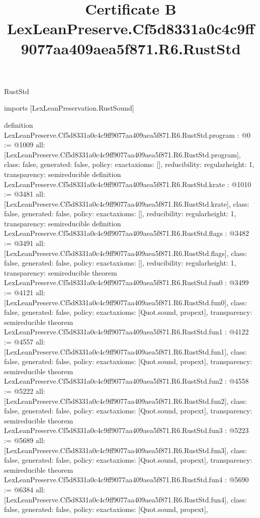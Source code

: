 \begin{lexlean}{RustStd}
\title{Certificate B LexLeanPreserve.Cf5d8331a0c4c9ff9077aa409aea5f871.R6.RustStd}
\begin{coremodule}
imports [LexLeanPreservation.RustSound]

definition LexLeanPreserve.Cf5d8331a0c4c9ff9077aa409aea5f871.R6.RustStd.program : @0 := @1009 {
  all: [LexLeanPreserve.Cf5d8331a0c4c9ff9077aa409aea5f871.R6.RustStd.program],
  class: false,
  generated: false,
  policy: exact{axioms: []},
  reducibility: regular{height: 1},
  transparency: semireducible
}
definition LexLeanPreserve.Cf5d8331a0c4c9ff9077aa409aea5f871.R6.RustStd.krate : @1010 := @3481 {
  all: [LexLeanPreserve.Cf5d8331a0c4c9ff9077aa409aea5f871.R6.RustStd.krate],
  class: false,
  generated: false,
  policy: exact{axioms: []},
  reducibility: regular{height: 1},
  transparency: semireducible
}
definition LexLeanPreserve.Cf5d8331a0c4c9ff9077aa409aea5f871.R6.RustStd.flags : @3482 := @3491 {
  all: [LexLeanPreserve.Cf5d8331a0c4c9ff9077aa409aea5f871.R6.RustStd.flags],
  class: false,
  generated: false,
  policy: exact{axioms: []},
  reducibility: regular{height: 1},
  transparency: semireducible
}
theorem LexLeanPreserve.Cf5d8331a0c4c9ff9077aa409aea5f871.R6.RustStd.fun0 : @3499 := @4121 {
  all: [LexLeanPreserve.Cf5d8331a0c4c9ff9077aa409aea5f871.R6.RustStd.fun0],
  class: false,
  generated: false,
  policy: exact{axioms: [Quot.sound, propext]},
  transparency: semireducible
}
theorem LexLeanPreserve.Cf5d8331a0c4c9ff9077aa409aea5f871.R6.RustStd.fun1 : @4122 := @4557 {
  all: [LexLeanPreserve.Cf5d8331a0c4c9ff9077aa409aea5f871.R6.RustStd.fun1],
  class: false,
  generated: false,
  policy: exact{axioms: [Quot.sound, propext]},
  transparency: semireducible
}
theorem LexLeanPreserve.Cf5d8331a0c4c9ff9077aa409aea5f871.R6.RustStd.fun2 : @4558 := @5222 {
  all: [LexLeanPreserve.Cf5d8331a0c4c9ff9077aa409aea5f871.R6.RustStd.fun2],
  class: false,
  generated: false,
  policy: exact{axioms: [Quot.sound, propext]},
  transparency: semireducible
}
theorem LexLeanPreserve.Cf5d8331a0c4c9ff9077aa409aea5f871.R6.RustStd.fun3 : @5223 := @5689 {
  all: [LexLeanPreserve.Cf5d8331a0c4c9ff9077aa409aea5f871.R6.RustStd.fun3],
  class: false,
  generated: false,
  policy: exact{axioms: [Quot.sound, propext]},
  transparency: semireducible
}
theorem LexLeanPreserve.Cf5d8331a0c4c9ff9077aa409aea5f871.R6.RustStd.fun4 : @5690 := @6384 {
  all: [LexLeanPreserve.Cf5d8331a0c4c9ff9077aa409aea5f871.R6.RustStd.fun4],
  class: false,
  generated: false,
  policy: exact{axioms: [Quot.sound, propext]},
}
\end{coremodule}
\end{lexlean}
